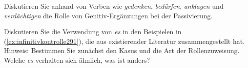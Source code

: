 \Uebung[\tristar]{} \label{exc:relationenundpraedikate11} Diskutieren Sie anhand von Verben wie \textit{gedenken}, \textit{bedürfen}, \textit{anklagen} und \textit{verdächtigen} die Rolle von Genitiv-Ergänzungen bei der Passivierung.

\Uebung[\tristar]{} \label{exc:relationenundpraedikate12} Diskutieren Sie die Verwendung von \textit{es} in den Beispielen in (\ref{ex:infinitivkontrolle291}), die \cite[51]{Mueller2008} aus existierender Literatur zusammengestellt hat.
Hinweis: Bestimmen Sie zunächst den Kasus und die Art der Rollenzuweisung.
Welche \textit{es} verhalten sich ähnlich, was ist anders?

\begin{exe}
  \ex\label{ex:infinitivkontrolle291}
  \begin{xlist}
  \end{xlist}
\end{exe}

